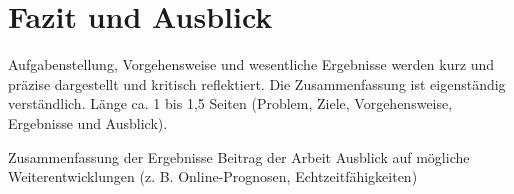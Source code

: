 
\chapter{Fazit und Ausblick}
Aufgabenstellung, Vorgehensweise und wesentliche Ergebnisse werden kurz und präzise dargestellt und kritisch reflektiert. Die Zusammenfassung ist eigenständig verständlich. Länge ca. 1 bis 1,5 Seiten (Problem, Ziele, Vorgehensweise, Ergebnisse und Ausblick).

Zusammenfassung der Ergebnisse
Beitrag der Arbeit
Ausblick auf mögliche Weiterentwicklungen (z. B. Online-Prognosen, Echtzeitfähigkeiten)